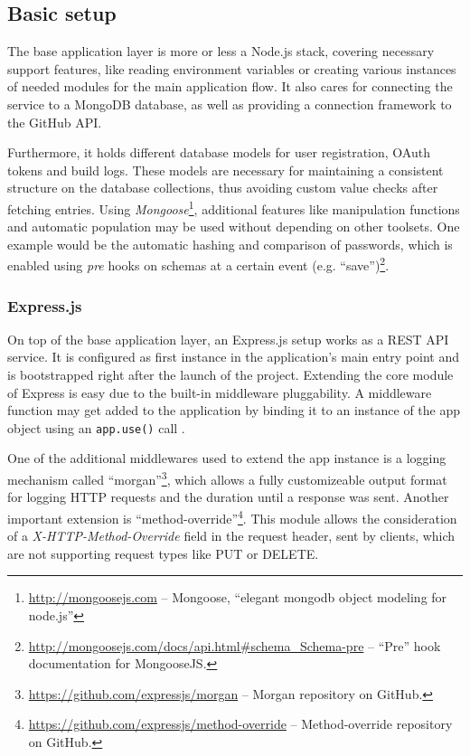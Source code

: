\subsection{Basic setup}
The base application layer is more or less a Node.js stack, covering necessary support features, like reading environment variables or creating various instances of needed modules for the main application flow. It also cares for connecting the service to a MongoDB database, as well as providing a connection framework to the GitHub API.

Furthermore, it holds different database models for user registration, OAuth tokens and build logs. These models are necessary for maintaining a consistent structure on the database collections, thus avoiding custom value checks after fetching entries. Using \emph{Mongoose}\footnote{\url{http://mongoosejs.com} -- Mongoose, ``elegant mongodb object modeling for node.js''}, additional features like manipulation functions and automatic population may be used without depending on other toolsets. One example would be the automatic hashing and comparison of passwords, which is enabled using \emph{pre} hooks on schemas at a certain event (e.g. ``save'')\footnote{\url{http://mongoosejs.com/docs/api.html\#schema_Schema-pre} -- ``Pre'' hook documentation for MongooseJS.}.

\subsubsection{Express.js}
On top of the base application layer, an Express.js setup works as a REST API service. It is configured as first instance in the application's main entry point and is bootstrapped right after the launch of the project. Extending the core module of Express is easy due to the built-in middleware pluggability. A middleware function may get added to the application by binding it to an instance of the app object using an \texttt{app.use()} call \cite{ExpressMiddleware}.

One of the additional middlewares used to extend the app instance is a logging mechanism called ``morgan''\footnote{\url{https://github.com/expressjs/morgan} -- Morgan repository on GitHub.}, which allows a fully customizeable output format for logging HTTP requests and the duration until a response was sent. Another important extension is ``method-override''\footnote{\url{https://github.com/expressjs/method-override} -- Method-override repository on GitHub.}. This module allows the consideration of a \emph{X-HTTP-Method-Override} field in the request header, sent by clients, which are not supporting request types like PUT or DELETE.

